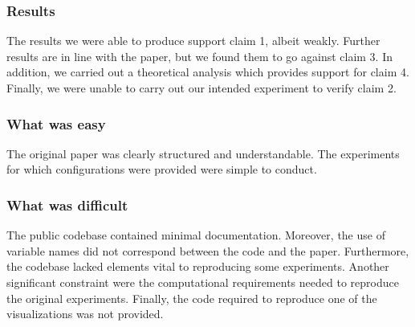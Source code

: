 \subsubsection*{Results}


The results we were able to produce support claim 1, albeit weakly. Further results are in line with the paper, but we found them to go against claim 3. In addition, we carried out a theoretical analysis which provides support for claim 4. Finally, we were unable to carry out our intended experiment to verify claim 2.

\subsubsection*{What was easy}


The original paper was clearly structured and understandable. The experiments for which configurations were provided were simple to conduct.

\subsubsection*{What was difficult}
The public codebase contained minimal documentation. Moreover, the use of variable names did not correspond between the code and the paper. Furthermore, the codebase lacked elements vital to reproducing some experiments. Another significant constraint were the computational requirements needed to reproduce the original experiments. Finally, the code required to reproduce one of the visualizations was not provided.


